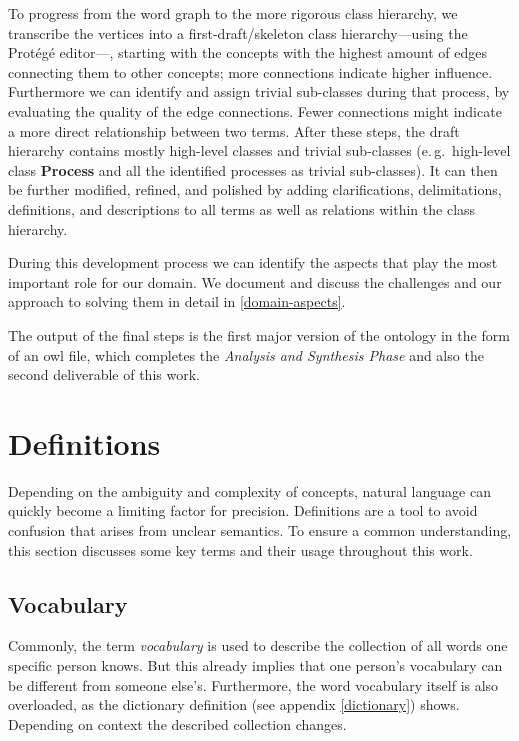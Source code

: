 \documentclass[a4paper, DIV=13, BCOR=0cm]{scrbook}
\newcommand{\eg}{e.\,g.\ }
\begin{document}
To progress from the word graph to the more rigorous class hierarchy, we transcribe the vertices into a first-draft/skeleton class hierarchy---using the Protégé editor---, starting with the concepts with the highest amount of edges connecting them to other concepts; more connections indicate higher influence. Furthermore we can identify and assign trivial sub-classes during that process, by evaluating the quality of the edge connections. Fewer connections might indicate a more direct relationship between two terms. After these steps, the draft hierarchy contains mostly high-level classes and trivial sub-classes (\eg high-level class \textbf{Process} and all the identified processes as trivial sub-classes). It can then be further modified, refined, and polished by adding clarifications, delimitations, definitions, and descriptions to all terms as well as relations within the class hierarchy.

During this development process we can identify the aspects that play the most important role for our domain. We document and discuss the challenges and our approach to solving them in detail in \autoref{domain-aspects}.

The output of the final steps is the first major version of the ontology in the form of an \gls{owl} file, which completes the \textit{Analysis and Synthesis Phase} and also the second deliverable of this work.

\section{Definitions}
\label{definitions}
Depending on the ambiguity and complexity of concepts, natural language can quickly become a limiting factor for precision. Definitions are a tool to avoid confusion that arises from unclear semantics. To ensure a common understanding, this section discusses some key terms and their usage throughout this work.

\subsection{Vocabulary}
\label{vocabulary}
Commonly, the term \textit{vocabulary} is used to describe the collection of all words one specific person knows. But this already implies that one person's vocabulary can be different from someone else's. Furthermore, the word vocabulary itself is also overloaded, as the dictionary definition (see appendix \ref{dictionary}) shows. Depending on context the described collection changes. \cite{mw-dictionary}
\end{document}

